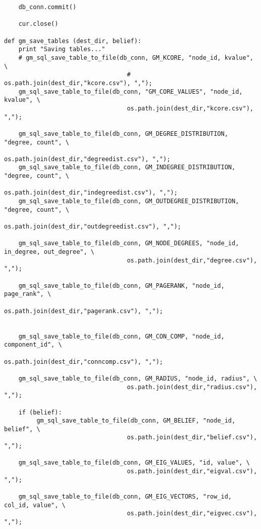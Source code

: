 \documentclass[11pt]{article}
\begin{document}
\begin{lstlisting}
    db_conn.commit()
                            
    cur.close()
    
def gm_save_tables (dest_dir, belief):
    print "Saving tables..."
    # gm_sql_save_table_to_file(db_conn, GM_KCORE, "node_id, kvalue", \
                                  # os.path.join(dest_dir,"kcore.csv"), ",");
    gm_sql_save_table_to_file(db_conn, "GM_CORE_VALUES", "node_id, kvalue", \
                                  os.path.join(dest_dir,"kcore.csv"), ",");

    gm_sql_save_table_to_file(db_conn, GM_DEGREE_DISTRIBUTION, "degree, count", \
                                  os.path.join(dest_dir,"degreedist.csv"), ",");
    gm_sql_save_table_to_file(db_conn, GM_INDEGREE_DISTRIBUTION, "degree, count", \
                                  os.path.join(dest_dir,"indegreedist.csv"), ",");
    gm_sql_save_table_to_file(db_conn, GM_OUTDEGREE_DISTRIBUTION, "degree, count", \
                                  os.path.join(dest_dir,"outdegreedist.csv"), ",");

    gm_sql_save_table_to_file(db_conn, GM_NODE_DEGREES, "node_id, in_degree, out_degree", \
                                  os.path.join(dest_dir,"degree.csv"), ",");

    gm_sql_save_table_to_file(db_conn, GM_PAGERANK, "node_id, page_rank", \
                                  os.path.join(dest_dir,"pagerank.csv"), ",");
                                  

    gm_sql_save_table_to_file(db_conn, GM_CON_COMP, "node_id, component_id", \
                                  os.path.join(dest_dir,"conncomp.csv"), ",");                               

    gm_sql_save_table_to_file(db_conn, GM_RADIUS, "node_id, radius", \
                                  os.path.join(dest_dir,"radius.csv"), ",");         
                        
    if (belief):
         gm_sql_save_table_to_file(db_conn, GM_BELIEF, "node_id, belief", \
                                  os.path.join(dest_dir,"belief.csv"), ",");     

    gm_sql_save_table_to_file(db_conn, GM_EIG_VALUES, "id, value", \
                                  os.path.join(dest_dir,"eigval.csv"), ",");                                 
                                  
    gm_sql_save_table_to_file(db_conn, GM_EIG_VECTORS, "row_id, col_id, value", \
                                  os.path.join(dest_dir,"eigvec.csv"), ",");                               
                                  


\end{lstlisting}
\end{document}
